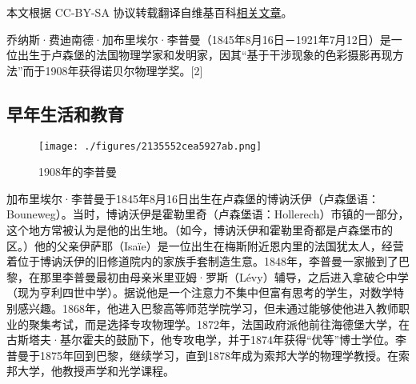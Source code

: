 
本文根据 CC-BY-SA 协议转载翻译自维基百科\href{https://en.wikipedia.org/wiki/Gabriel_Lippmann}{相关文章}。

乔纳斯·费迪南德·加布里埃尔·李普曼（1845年8月16日－1921年7月12日）是一位出生于卢森堡的法国物理学家和发明家，因其“基于干涉现象的色彩摄影再现方法”而于1908年获得诺贝尔物理学奖。[2]
\subsection{早年生活和教育}
\begin{figure}[ht]
\centering
\texttt{[image: ./figures/2135552cea5927ab.png]}
\caption{1908年的李普曼} \label{fig_LPM_1}
\end{figure}
加布里埃尔·李普曼于1845年8月16日出生在卢森堡的博讷沃伊（卢森堡语：Bouneweg）。当时，博讷沃伊是霍勒里奇（卢森堡语：Hollerech）市镇的一部分，这个地方常被认为是他的出生地。（如今，博讷沃伊和霍勒里奇都是卢森堡市的区。）他的父亲伊萨耶（Isaïe）是一位出生在梅斯附近恩内里的法国犹太人，经营着位于博讷沃伊的旧修道院内的家族手套制造生意。1848年，李普曼一家搬到了巴黎，在那里李普曼最初由母亲米里亚姆·罗斯（Lévy）辅导，之后进入拿破仑中学（现为亨利四世中学）。据说他是一个注意力不集中但富有思考的学生，对数学特别感兴趣。1868年，他进入巴黎高等师范学院学习，但未通过能够使他进入教师职业的聚集考试，而是选择专攻物理学。1872年，法国政府派他前往海德堡大学，在古斯塔夫·基尔霍夫的鼓励下，他专攻电学，并于1874年获得“优等”博士学位。李普曼于1875年回到巴黎，继续学习，直到1878年成为索邦大学的物理学教授。在索邦大学，他教授声学和光学课程。